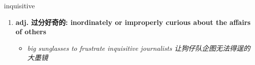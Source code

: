 
\begin{frame}
{\huge inquisitive}
\begin{center}
\begin{enumerate}\Large
  \item \textbf{adj. 过分好奇的: inordinately or improperly curious about the affairs of others}
  \begin{itemize}
    \item \em{\Large{big sunglasses to frustrate inquisitive journalists 让狗仔队企图无法得逞的大墨镜}}
  \end{itemize}
\end{enumerate}
\end{center}
\end{frame}
